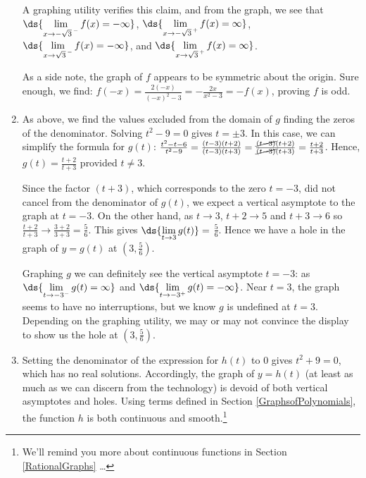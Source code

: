 \documentclass{ximera}
\begin{document}
\begin{example}
\begin{enumerate}
A graphing utility verifies this claim, and from the graph, we see that  $\ds{\lim_{x \rightarrow -\sqrt{3}^{\, -}} f(x) = -\infty}$, $\ds{\lim_{x \rightarrow -\sqrt{3}^{\, +}} f(x) = \infty}$, $\ds{\lim_{x \rightarrow \sqrt{3}^{\, -}} f(x) = -\infty}$, and $\ds{\lim_{x \rightarrow \sqrt{3}^{\, +}} f(x) = \infty}$.

As a side note, the graph of $f$ appears to be symmetric about the origin.  Sure enough, we find: $f(-x) = \frac{2(-x)}{(-x)^2-3} = -\frac{2x}{x^2-3} = -f(x)$, proving $f$ is odd.

\begin{center}
\end{center} 

\item  As above, we find the values excluded from the domain of $g$ finding the zeros of the denominator.  Solving $t^2 - 9 = 0$ gives $t = \pm 3$.  In this case, we can simplify the formula for $g(t)$:  $\frac{t^2-t-6}{t^2-9} = \frac{(t-3)(t+2)}{(t-3)(t+3)} =\frac{\cancel{(t-3)}(t+2)}{\cancel{(t-3)}(t+3)} =  \frac{t+2}{t+3}$.   Hence, $g(t) = \frac{t+2}{t+3}$ provided $t \neq 3$.  

Since the factor $(t+3)$, which corresponds to the zero $t = -3$, did not cancel from the denominator of $g(t)$, we expect a vertical asymptote to the graph at $t = -3$.  On the other hand, as $t \rightarrow 3$, $t+2 \rightarrow 5$ and $t+3 \rightarrow 6$ so $\frac{t+2}{t+3} \rightarrow \frac{3+2}{3+3} = \frac{5}{6}$.  This gives $\ds{\lim_{t \rightarrow 3} g(t)} =$  $\frac{5}{6}$.   Hence we have a hole in the graph of $y = g(t)$ at  $\left(3, \frac{5}{6}\right)$.

 Graphing $g$ we can definitely see the vertical asymptote $t=-3$:  as  $\ds{\lim_{t \rightarrow -3^{-}} g(t) = \infty}$ and $\ds{\lim_{t \rightarrow -3^{+}} g(t) = -\infty}$.  Near $t=3$, the graph seems to have no interruptions, but we know $g$ is undefined at $t=3$.  Depending on the graphing utility, we may or may not convince the display to show us the hole at $\left(3, \frac{5}{6}\right)$.



\begin{center}
\end{center} 

\item  Setting the denominator of the expression for $h(t)$ to $0$ gives $t^2+9 = 0$, which has no real solutions.  Accordingly, the graph of $y=h(t)$ (at least as much as we can discern from the technology) is devoid of both vertical asymptotes and holes.  Using terms defined in Section \ref{GraphsofPolynomials},  the function $h$ is both continuous and smooth.\footnote{We'll remind you more about continuous functions in Section \ref{RationalGraphs}  \ldots}


\end{enumerate}
\end{example}
\end{document}
